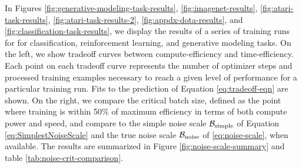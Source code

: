 \documentclass[english]{article}
\begin{document}
In Figures \ref{fig:generative-modeling-task-results}, \ref{fig:imagenet-results}, \ref{fig:atari-task-results}, \ref{fig:atari-task-results-2}, \ref{fig:appdx-dota-results}, and \ref{fig:classification-task-results}, we display the results of a series of training runs for for classification, reinforcement learning, and generative modeling tasks. On the left, we show tradeoff curves between compute-efficiency and time-efficiency. Each point on each tradeoff curve represents the number of optimizer steps and processed training examples necessary to reach a given level of performance for a particular training run. Fits to the prediction of Equation \ref{eq:tradeoff-eqn} are shown. On the right, we compare the critical batch size, defined as the point where training is within 50\% of maximum efficiency in terms of both compute power and speed, and compare to the simple noise scale $\mathcal{B}_{{\rm simple}}$ of Equation \ref{eq:SimplestNoiseScale} and the true noise scale $\mathcal{B}_{{\rm noise}}$ of \ref{eq:noise-scale}, when available.  The results are summarized in Figure \ref{fig:noise-scale-summary} and table \ref{tab:noise-crit-comparison}.
\end{document}
